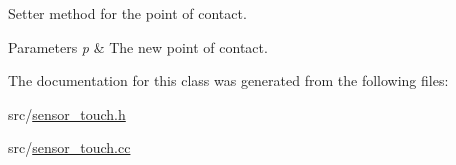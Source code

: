 Setter method for the point of contact. 


\begin{DoxyParams}{Parameters}
{\em p} & The new point of contact. \\
\hline
\end{DoxyParams}


The documentation for this class was generated from the following files\+:\begin{DoxyCompactItemize}
\item 
src/\mbox{\hyperlink{sensor__touch_8h}{sensor\+\_\+touch.\+h}}\item 
src/\mbox{\hyperlink{sensor__touch_8cc}{sensor\+\_\+touch.\+cc}}\end{DoxyCompactItemize}
